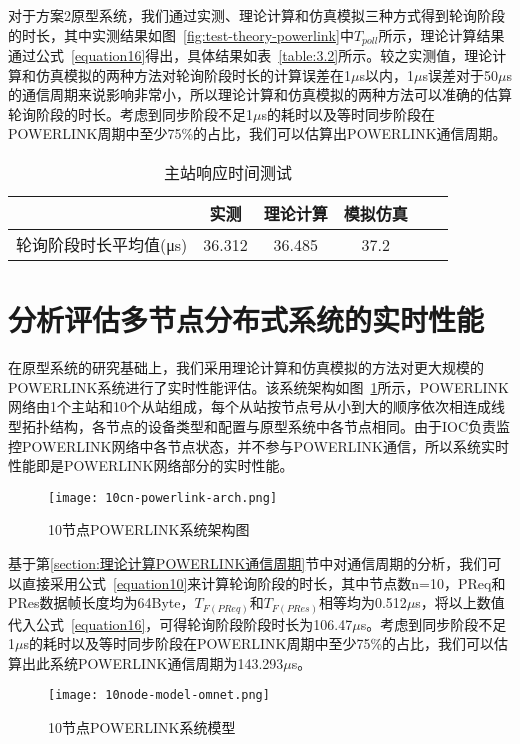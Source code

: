对于方案2原型系统，我们通过实测、理论计算和仿真模拟三种方式得到轮询阶段的时长，其中实测结果如图~\ref{fig:test-theory-powerlink}中$T_{poll}$所示，理论计算结果通过公式~\ref{equation16}得出，具体结果如表~\ref{table:3.2}所示。较之实测值，理论计算和仿真模拟的两种方法对轮询阶段时长的计算误差在1$\mu$s以内，1$\mu$s误差对于50$\mu$s的通信周期来说影响非常小，所以理论计算和仿真模拟的两种方法可以准确的估算轮询阶段的时长。考虑到同步阶段不足1$\mu$s的耗时以及等时同步阶段在POWERLINK周期中至少75\%的占比，我们可以估算出POWERLINK通信周期。

\begin{table}[hbt]
	\centering
	\caption{主站响应时间测试}
	\begin{tabular}{cccccc}
		\toprule
		 & 实测 & 理论计算 & 模拟仿真 \\
		\midrule
		轮询阶段时长平均值(μs)& 36.312 & 36.485   & 37.2\\
		\bottomrule
	\end{tabular}
	\label{table:3.3}
\end{table}

\section{分析评估多节点分布式系统的实时性能}

在原型系统的研究基础上，我们采用理论计算和仿真模拟的方法对更大规模的POWERLINK系统进行了实时性能评估。该系统架构如图~\ref{fig:10cn-powerlink-arch}所示，POWERLINK网络由1个主站和10个从站组成，每个从站按节点号从小到大的顺序依次相连成线型拓扑结构，各节点的设备类型和配置与原型系统中各节点相同。由于IOC负责监控POWERLINK网络中各节点状态，并不参与POWERLINK通信，所以系统实时性能即是POWERLINK网络部分的实时性能。

\begin{figure}[!htb]
  \centering
  \texttt{[image: 10cn-powerlink-arch.png]}
  \caption{10节点POWERLINK系统架构图}
  \label{fig:10cn-powerlink-arch}
\end{figure}

基于第\ref{section:理论计算POWERLINK通信周期}节中对通信周期的分析，我们可以直接采用公式~\ref{equation10}来计算轮询阶段的时长，其中节点数n=10，PReq和PRes数据帧长度均为64Byte，$T_{F(PReq)}$和$T_{F(PRes)}$相等均为0.512$\mu$s，将以上数值代入公式~\ref{equation16}，可得轮询阶段阶段时长为106.47$\mu$s。考虑到同步阶段不足1$\mu$s的耗时以及等时同步阶段在POWERLINK周期中至少75\%的占比，我们可以估算出此系统POWERLINK通信周期为143.293$\mu$s。

\begin{figure}[!htb]
  \centering
  \texttt{[image: 10node-model-omnet.png]}
  \caption{10节点POWERLINK系统模型}
  \label{fig:10node-model-omnet}
\end{figure}

